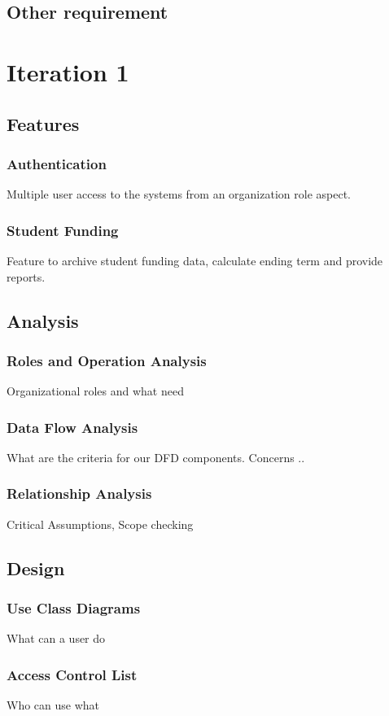 \documentclass{journal}
\begin{document}
\subsection{Other requirement}

\newpage

\section{Iteration 1}
\subsection{Features}
\subsubsection{Authentication}
Multiple user access to the systems from an organization role aspect.
\subsubsection{Student Funding}
Feature to archive student funding data, calculate ending term and provide reports.
\subsection{Analysis}
\subsubsection{Roles and Operation Analysis}
Organizational roles and what need 
\subsubsection{Data Flow Analysis}
What are the criteria for our DFD components. Concerns .. 
\subsubsection{Relationship Analysis}
Critical Assumptions, Scope checking
\subsection{Design}
\subsubsection{Use Class Diagrams}
What can a user do
\subsubsection{Access Control List}
Who can use what
\end{document}
